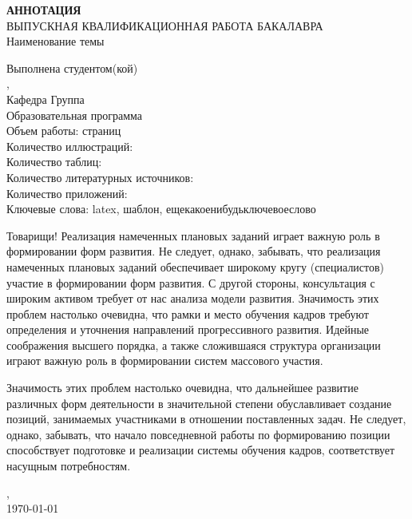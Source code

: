 \thispagestyle{empty}
\newpage

\begin{center}
	\textbf{АННОТАЦИЯ} \\
	\vspace{5mm}
	ВЫПУСКНАЯ КВАЛИФИКАЦИОННАЯ РАБОТА БАКАЛАВРА \\
	Наименование темы \uline{\topic\hfill} \\
	\hrulefill
\end{center}

\begin{flushleft}
	Выполнена студентом(кой) \uline{\studentformedname\hfill} \\
	\faculty, \university \\
	Кафедра \uline{\department\hfill} Группа \uline{\group} \\
	Образовательная программа \programnum\thinspace\programname \\
	\vspace{5mm}
	Объем работы:  страниц \\
	Количество иллюстраций: \totalfigures \\
	Количество таблиц: \totaltables \\
	Количество литературных источников:  \\
	Количество приложений:  \\
	Ключевые слова: latex, шаблон, ещекакоенибудьключевоеслово
\end{flushleft}


Товарищи! Реализация намеченных плановых заданий играет важную роль в формировании форм развития. Не следует, однако, забывать, что реализация намеченных плановых заданий обеспечивает широкому кругу (специалистов) участие в формировании форм развития. С другой стороны, консультация с широким активом требует от нас анализа модели развития. Значимость этих проблем настолько очевидна, что рамки и место обучения кадров требуют определения и уточнения направлений прогрессивного развития. Идейные соображения высшего порядка, а также сложившаяся структура организации играют важную роль в формировании систем массового участия.

Значимость этих проблем настолько очевидна, что дальнейшее развитие различных форм деятельности в значительной степени обуславливает создание позиций, занимаемых участниками в отношении поставленных задач. Не следует, однако, забывать, что начало повседневной работы по формированию позиции способствует подготовке и реализации системы обучения кадров, соответствует насущным потребностям.

\begin{flushleft}
	\vfill
	\student, \\ %
	\today
\end{flushleft}